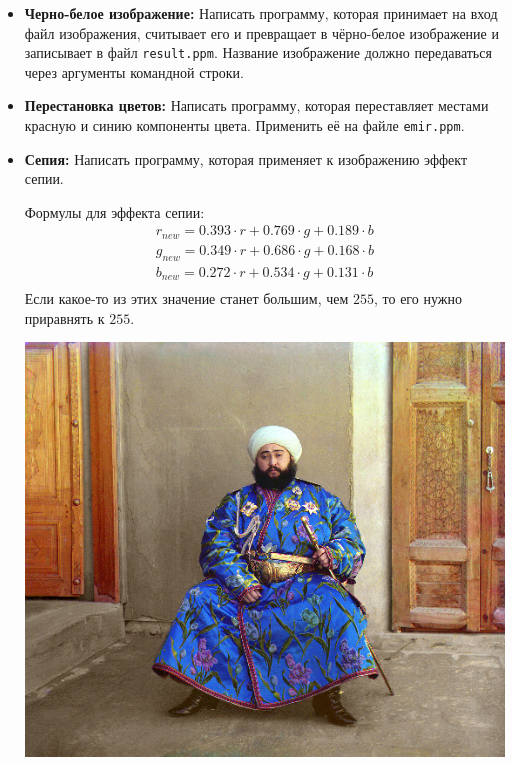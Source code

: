 \documentclass{article}
\begin{document}
\begin{itemize}
\item \textbf{Черно-белое изображение:} Написать программу, которая принимает на вход файл изображения, считывает его и превращает в чёрно-белое изображение и записывает в файл \texttt{result.ppm}. Название изображение должно передаваться через аргументы командной строки. \\
\item \textbf{Перестановка цветов:} Написать программу, которая переставляет местами красную и синию компоненты цвета. Применить её на файле \texttt{emir.ppm}.
\item \textbf{Сепия:} Написать программу, которая применяет к изображению эффект сепии.
\begin{multicols}{3}
Формулы для эффекта сепии:
\begin{align*}
r_{new} = 0.393 \cdot r + 0.769 \cdot g + 0.189 \cdot b\\
g_{new} = 0.349 \cdot r + 0.686 \cdot g + 0.168 \cdot b\\
b_{new} = 0.272 \cdot r + 0.534 \cdot g + 0.131 \cdot b\\
\end{align*}
Если какое-то из этих значение станет большим, чем $255$, то его нужно приравнять к $255$.
\vfill			
\begin{center}
\includegraphics[scale=0.26]{../images/imageproc.jpg}
\end{center}
\vfill			
\begin{center}

\end{center}
\end{multicols}
\end{itemize}
\end{document}
